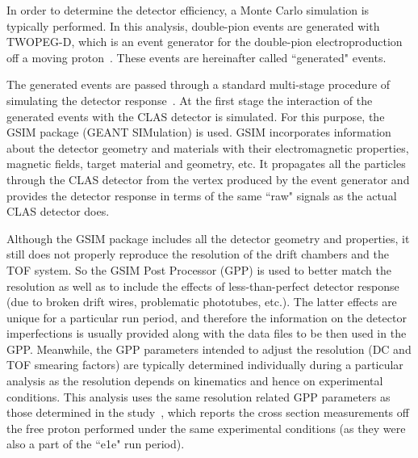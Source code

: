 
In order to determine the detector efficiency, a Monte Carlo simulation is typically performed. In this analysis, double-pion events are generated with TWOPEG-D, which is an event generator for the double-pion electroproduction off a moving proton~\cite{twopeg-d}. These events are hereinafter called ``generated" events. 

The generated events are passed through a standard multi-stage procedure of simulating the detector response~\cite{Mecking:2003zu}. At the first stage the interaction of the generated events with the CLAS detector is simulated. For this purpose, the GSIM package (GEANT SIMulation) is used. GSIM incorporates information about the detector geometry and materials with their electromagnetic properties, magnetic fields, target material and geometry, etc. It  propagates all the particles through the CLAS detector from the vertex produced by the event generator and provides the detector response in terms of the same ``raw" signals as the actual CLAS detector does.

Although the GSIM package includes all the detector geometry and properties, it still does not properly reproduce the resolution of the drift chambers and the TOF system. So the GSIM Post Processor (GPP) is used to better match the resolution as well as to include the effects of less-than-perfect detector response (due to broken drift wires, problematic phototubes, etc.). The latter effects are unique for a particular run period, and therefore the information on the detector imperfections is usually provided along with the data files to be then used in the GPP. Meanwhile, the GPP parameters intended to adjust the resolution (DC and TOF smearing factors) are typically determined individually during a particular analysis as the resolution depends on kinematics and hence on experimental conditions. This analysis uses the same resolution related GPP parameters as those determined in the study~\cite{Fed_an_note:2017,Fed_paper_2018}, which reports the cross section measurements off the free proton performed under the same experimental conditions (as they were also a part of the ``e1e" run period). 



